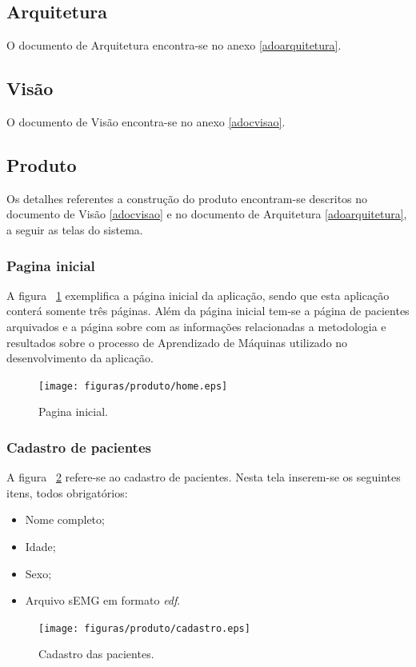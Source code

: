 \subsection{Arquitetura}
O documento de Arquitetura encontra-se no anexo \ref{adoarquitetura}.

\subsection{Visão}
O documento de Visão encontra-se no anexo \ref{adocvisao}.

\subsection{Produto}
Os detalhes referentes a construção do produto encontram-se descritos no documento de Visão \ref{adocvisao} e no documento de Arquitetura \ref{adoarquitetura}, a seguir as telas do sistema.


\subsubsection{Pagina inicial}
A figura ~\ref{fighome} exemplifica a página inicial da aplicação, sendo que esta aplicação  conterá somente três páginas. Além da página inicial tem-se a página de pacientes arquivados e a página sobre com as informações relacionadas a metodologia e resultados sobre o processo de Aprendizado de Máquinas utilizado no desenvolvimento da aplicação.

\begin{figure}[!htb]
    \centering
    \texttt{[image: figuras/produto/home.eps]}
    \caption{Pagina inicial.}
    \label{fighome}
\end{figure}

\subsubsection{Cadastro de pacientes}
A figura ~\ref{figcadastro} refere-se ao cadastro de pacientes. Nesta tela inserem-se os seguintes itens, todos obrigatórios:
\begin{itemize}
    \item Nome completo;
    \item Idade;
    \item Sexo;
    \item Arquivo sEMG em formato \textit{edf}.
\end{itemize}

\begin{figure}[!htb]
    \centering
    \texttt{[image: figuras/produto/cadastro.eps]}
    \caption{Cadastro das pacientes.}
    \label{figcadastro}
\end{figure}

